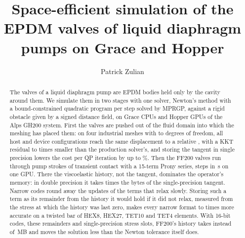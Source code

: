 \documentclass[sigconf,nonacm]{acmart}
\begin{document}
\title{Space-efficient simulation of the EPDM valves of liquid diaphragm pumps on Grace and
Hopper}

\author{Patrick Zulian}

\begin{abstract}
The valves of a liquid diaphragm pump are EPDM bodies held only by the cavity around them. We
simulate them in two stages with one solver, Newton's method with a bound-constrained quadratic
program per step solved by MPRGP, against a rigid obstacle given by a signed distance field, on
Grace CPUs and Hopper GPUs of the Alps GH200 system. First the valves are pushed out of the fluid
domain into which the meshing has placed them: on four industrial meshes with \dofsMin{} to
\dofsMax{} degrees of freedom, all host and device configurations reach the same displacement to
a relative \agreeParallel{}, with a KKT residual \kktRatioMin{} to \kktRatioMax{} times smaller
than the production solver's, and storing the tangent in single precision lowers the cost per QP
iteration by up to \singleMax\%. Then the FF200 valves run through \trStrokes{} pump strokes of
transient contact with a 15-term Prony series, \trStepsFinal{} steps in \trSteppingFinal\,\si{\second}
on one GPU. There the viscoelastic history, not the tangent, dominates the operator's memory: in
double precision it takes \hsStateOverTangent{} times the bytes of the single-precision tangent.
Narrow codes round away the updates of the terms that relax slowly. Storing such a term as its
remainder from the history it would hold if it did not relax, measured from the stress at which
the history was last zero, makes every narrow format \hsRemGainMin{} to \hsRemGainMax{} times
more accurate on a twisted bar of HEX8, HEX27, TET10 and TET4 elements. With 16-bit codes,
these remainders and single-precision stress slots, FF200's history takes
\hsStateSixteenSlotsMB{} instead of \hsStateFullMB\,MB and moves the solution less than the Newton
tolerance itself does.
\end{abstract}

\maketitle
\end{document}
